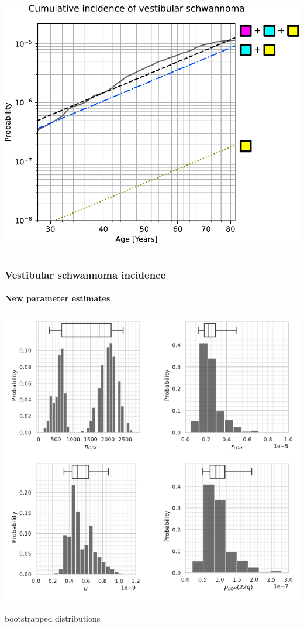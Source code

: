 \documentclass{beamer}
\begin{document}
\begin{frame}
\begin{columns}
\begin{column}{0.5\textwidth}
            \includegraphics[width=1.0\textwidth]{figures/figure-5-3Hit-feb22}
        \end{column}
    \end{columns}
\end{frame}

\begin{frame}
    \frametitle{Vestibular schwannoma incidence}
    \framesubtitle{New parameter estimates}

    \begin{center}
    \includegraphics[height=0.85\textheight]{figures/Fig3-combined-bw-oct22}

    \;

        \tiny{bootstrapped distributions}
    \end{center}
\end{frame}
\end{document}
